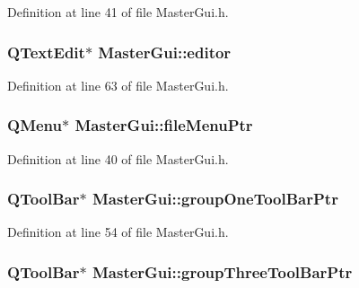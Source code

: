 Definition at line 41 of file Master\-Gui.\-h.

\hypertarget{class_master_gui_a0681f0b3d1828d84c0c0cd7e4d765d98}{
\subsubsection[{editor}]{\setlength{\rightskip}{0pt plus 5cm}Q\-Text\-Edit$\ast$ Master\-Gui\-::editor\hspace{0.3cm}{\ttfamily [private]}}}\label{class_master_gui_a0681f0b3d1828d84c0c0cd7e4d765d98}


Definition at line 63 of file Master\-Gui.\-h.

\hypertarget{class_master_gui_a1d768ad74ddb657928df8539c356abb6}{
\subsubsection[{file\-Menu\-Ptr}]{\setlength{\rightskip}{0pt plus 5cm}Q\-Menu$\ast$ Master\-Gui\-::file\-Menu\-Ptr\hspace{0.3cm}{\ttfamily [private]}}}\label{class_master_gui_a1d768ad74ddb657928df8539c356abb6}


Definition at line 40 of file Master\-Gui.\-h.

\hypertarget{class_master_gui_a67441e41e16e245976536f18cd7f2d6d}{
\subsubsection[{group\-One\-Tool\-Bar\-Ptr}]{\setlength{\rightskip}{0pt plus 5cm}Q\-Tool\-Bar$\ast$ Master\-Gui\-::group\-One\-Tool\-Bar\-Ptr\hspace{0.3cm}{\ttfamily [private]}}}\label{class_master_gui_a67441e41e16e245976536f18cd7f2d6d}


Definition at line 54 of file Master\-Gui.\-h.

\hypertarget{class_master_gui_af620c7fd8a0903c84581a657d23ef45b}{
\subsubsection[{group\-Three\-Tool\-Bar\-Ptr}]{\setlength{\rightskip}{0pt plus 5cm}Q\-Tool\-Bar$\ast$ Master\-Gui\-::group\-Three\-Tool\-Bar\-Ptr\hspace{0.3cm}{\ttfamily [private]}}}\label{class_master_gui_af620c7fd8a0903c84581a657d23ef45b}


